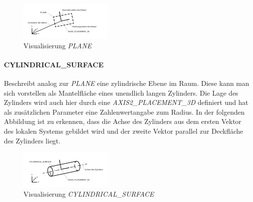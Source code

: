 \begin{figure}[h]
	\centering
	
	\includegraphics[width=\linewidth]{img/plane_entity.pdf}
	
	
	\caption{Visualisierung \textit{PLANE}}
	
\end{figure} 

\paragraph{CYLINDRICAL\_SURFACE}


Beschreibt analog zur \textit{PLANE} eine zylindrische Ebene im Raum. Diese kann man sich vorstellen als Mantelfläche eines unendlich langen Zylinders. Die Lage des Zylinders wird auch hier durch eine \textit{AXIS2\_PLACEMENT\_3D} definiert und hat als zusätzlichen Parameter eine Zahlenwertangabe zum Radius. In der folgenden Abbildung ist zu erkennen, dass die Achse des Zylinders aus dem ersten Vektor des lokalen Systems gebildet wird und der zweite Vektor parallel zur Deckfläche des Zylinders liegt.

\begin{figure}[h]
	\centering
	
	\includegraphics[width=\linewidth]{img/cylinder_entity.pdf}
	
	\caption{Visualisierung \textit{CYLINDRICAL\_SURFACE}}
	
\end{figure}

